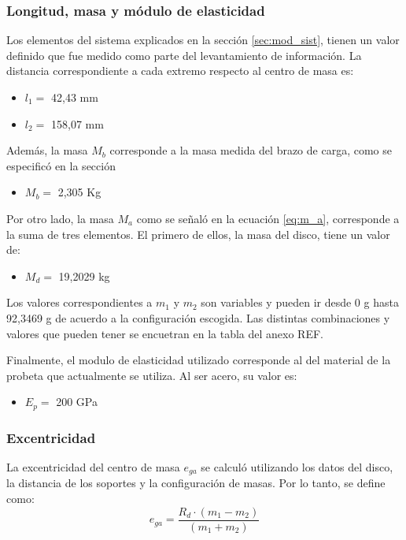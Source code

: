 \subsubsection{Longitud, masa y módulo de elasticidad}
Los elementos del sistema explicados en la sección \ref{sec:mod_sist}, tienen un valor definido que fue medido como parte del levantamiento de información. La distancia correspondiente a cada extremo respecto al centro de masa es:
\begin{itemize}
	\item $l_1=$ 42,43 mm
	\item $l_2=$ 158,07 mm
\end{itemize}
Además, la masa $M_b$ corresponde a la masa medida del brazo de carga, como se especificó en la sección
\begin{itemize}
	\item $M_b=$ 2,305 Kg
\end{itemize}
Por otro lado, la masa $M_a$ como se señaló en la ecuación \ref{eq:m_a}, corresponde a la suma de tres elementos. El primero de ellos, la masa del disco, tiene un valor de:
\begin{itemize}
	\item $M_d=$ 19,2029 kg
\end{itemize}
Los valores correspondientes a $m_1$ y $m_2$ son variables y pueden ir desde 0 g hasta 92,3469 g de acuerdo a la configuración escogida. Las distintas combinaciones y valores que pueden tener se encuetran en la tabla del anexo REF.

Finalmente, el modulo de elasticidad utilizado corresponde al del material de la probeta que actualmente se utiliza. Al ser acero, su valor es:
\begin{itemize}
	\item $E_p=$ 200 GPa
\end{itemize}
\subsubsection{Excentricidad}
La excentricidad del centro de masa $e_{ga}$ se calculó utilizando los datos del disco, la distancia de los soportes y la configuración de masas. Por lo tanto, se define como:
\begin{equation}
	e_{ga} = \frac{R_d\cdot (m_1 - m_2)}{(m_1 + m_2)}
\end{equation}
